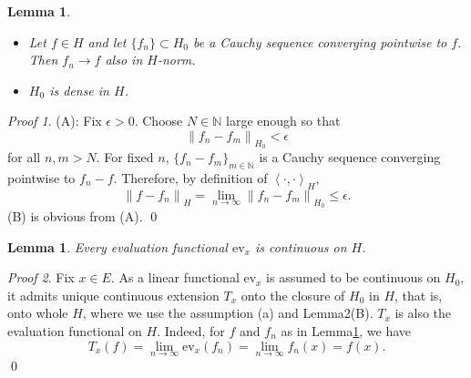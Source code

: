 \documentclass[a4paper,12pt]{article}
\newtheorem{lem}[thm]{Lemma}
\theoremstyle{remark}
\newtheorem*{prf}{Proof}
\theoremstyle{definition}
\theoremstyle{definition}
\theoremstyle{definition}
\newcommand{\ip}[2]{\left<#1, #2 \right>}
\newcommand{\norm}[1]{\left\| #1 \right\|}
\newcommand{\ev}[1]{\mathrm{ev}_{#1}}
\begin{document}
\begin{lem}\label{Lemma density of H0 in H}
	\begin{itemize}
		\item[(A)] Let \( f \in H \) and let \( \{f_n\} \subset H_0 \) be a Cauchy sequence converging pointwise to \( f \). Then \( f_n \to f \) also in \( H \)-norm.
		\item[(B)] \( H_0 \) is dense in \( H \).
	\end{itemize}
\end{lem}
\begin{prf}
	(A): Fix \( \epsilon>0 \). Choose \( N \in \mathbb{N}\) large enough so that
	\begin{equation*}
		\norm{f_n - f_m}_{H_0} < \epsilon
	\end{equation*}
	for all \( n,m >N \). For fixed \( n \), \( \{f_n-f_m\}_{m \in \mathbb{N}} \) is a Cauchy sequence converging pointwise to \( f_n-f \). Therefore, by definition of \( \ip{\cdot }{\cdot }_H \),
	\begin{equation*}
		\norm{f-f_n}_H = \lim_{n \to \infty}\norm{f_n - f_m}_{H_0} \le \epsilon.
	\end{equation*}
	(B) is obvious from (A).
	\qed\end{prf}

\begin{lem}\label{continuity of evaluation}
	Every evaluation functional \( \ev{x} \) is continuous on \( H \).
\end{lem}
\begin{prf}
	Fix \( x \in E \). As a linear functional \( \ev{x} \) is assumed to be continuous on \( H_0 \), it admits unique continuous extension \( T_x \) onto the closure of \( H_0 \) in \( H \), that is, onto whole \( H \), where we use the assumption (a) and Lemma2(B). \( T_x \) is also the evaluation functional on \( H \). Indeed, for \( f \) and \( f_n \) as in Lemma\ref{Lemma density of H0 in H}, we have
	\begin{equation*}
		T_x(f) = \lim_{n \to \infty} \ev{x}(f_n) = \lim_{n \to \infty}f_n(x) = f(x).
	\end{equation*}
	\qed\end{prf}
\end{document}
